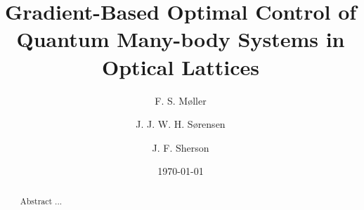 \documentclass[%
 reprint,
 amsmath,amssymb,
 aps,
pra,
]{revtex4-1}
\begin{document}

\title{Gradient-Based Optimal Control of Quantum Many-body Systems in Optical Lattices}%

\author{F. S. M\o ller}
\author{J. J. W. H. S\o rensen}
\author{J. F. Sherson}
\date{\today}%

\begin{abstract}
Abstract ...


\end{abstract}

\maketitle










%

\end{document}
